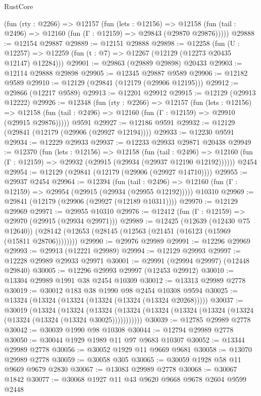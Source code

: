 \begin{lexlean}{RustCore}
\begin{coremodule}
    (fun (rty : @2266) =>
    @12157
      (fun (lets : @12156) =>
      @12158 (fun (tail : @2496) => @12160 (fun (Γ : @12159) => @29843 (@29870 @29876)))))
@29888 := @12154 @29887
@29889 := @12151 @29888
@29898 := @12258
    (fun (U : @12257) => @12259 (fun (t : @7) => @12267 (@12129 (@12273 @20435 @12147) @12284)))
@29901 := @29863 (@29889 @29898) @20433
@29903 := @12114 @29888 @29898
@29905 := @12345 @29887 @9589
@29906 := @12182 @9589
@29910 := @12129 (@29841 (@12179 (@29906 @12195)))
@29912 := @29866 (@12217 @9589)
@29913 := @12201 @29912
@29915 := @12129 (@29913 @12222)
@29926 := @12348
    (fun (rty : @2266) =>
    @12157
      (fun (lets : @12156) =>
      @12158 (fun (tail : @2496) => @12160 (fun (Γ : @12159) => @29910 (@29915 @29876)))))
    @9591
@29927 := @12186 @9591
@29932 := @12129 (@29841 (@12179 (@29906 (@29927 @12194))))
@29933 := @12230 @9591
@29934 := @12229 @29933
@29937 := @12233 @29933 @29871 @20438
@29949 := @12370
    (fun (lets : @12156) =>
    @12158
      (fun (tail : @2496) =>
      @12160 (fun (Γ : @12159) => @29932 (@29915 (@29934 (@29937 @12190 @12192))))))
    @2454
@29954 := @12129 (@29841 (@12179 (@29906 (@29927 @14710))))
@29955 := @29937 @2454
@29964 := @12394
    (fun (tail : @2496) => @12160 (fun (Γ : @12159) => @29954 (@29915 (@29934 (@29955 @12192)))))
    @10310
@29969 := @29841 (@12179 (@29906 (@29927 (@12189 @10311))))
@29970 := @12129 @29969
@29971 := @29955 @10310
@29976 := @12412 (fun (Γ : @12159) => @29970 (@29915 (@29934 @29971)))
@29989 := @12425
    (@12639 (@12430 @75 @12640))
    (@28142 (@12653 (@28145 (@12563 (@21451 (@16123 (@15969 (@15811 @28706))))))))
@29990 := @29976 @29989
@29991 := @12296 @29969
@29993 := @29913 (@12221 @29989)
@29994 := @12129 @29993
@29997 := @12228 @29989 @29933 @29971
@30001 := @29991 (@29994 @29997) (@12448 @29840)
@30005 := @12296 @29993 @29997 (@12453 @29912)
@30010 := @13304 @29989 @1991 @38 @2454 @10309
@30012 := @13313 @29989 @2778
@30019 := @30012 @183 @38 @1990 @98 @2454 @10308 @9594
@30025 := @13324 (@13324 (@13324 (@13324 (@13324 (@13324 @20268)))))
@30037 := @30019
    (@13324
      (@13324
        (@13324 (@13324 (@13324 (@13324 (@13324 (@13324 (@13324 (@13324 (@13324 @30025)))))))))))
@30039 := @12785 @29989 @2778
@30042 := @30039 @1990 @98 @10308
@30044 := @12794 @29989 @2778
@30050 := @30044 @1929 @1989 @11 @97 @9683 @10307
@30052 := @13344 @29989 @2778
@30056 := @30052 @1929 @11 @9669 @9681
@30058 := @13070 @29989 @2778
@30059 := @30058 @305
@30065 := @30059 @1928 @58 @11 @9669 @9679 @2830
@30067 := @13083 @29989 @2778
@30068 := @30067 @1842
@30077 := @30068 @1927 @11 @43 @9620 @9668 @9678 @2604 @9599 @2448

\end{coremodule}
\end{lexlean}
